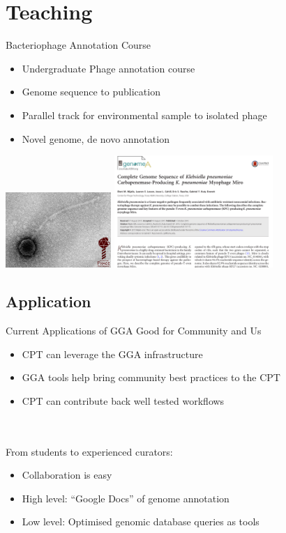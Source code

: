 \documentclass[12pt]{phage3slides} %
\begin{document}
\section{Teaching}
\begin{frame}{Bacteriophage Annotation Course}
    \begin{itemize}
        \item Undergraduate Phage annotation course
        \item Genome sequence to publication
        \item Parallel track for environmental sample to isolated phage
        \item Novel genome, de novo annotation
    \end{itemize}
    \includegraphics[width=4cm]{phage.png}
    \includegraphics[width=6cm]{pub.png}
\end{frame}

\subsection{Application}
\begin{frame}{Current Applications of GGA}
    Good for Community and Us
    \begin{itemize}
        \item CPT can leverage the GGA infrastructure
        \item GGA tools help bring community best practices to the CPT
        \item CPT can contribute back well tested workflows
    \end{itemize}
    \ \\\ \\
    From students to experienced curators:
    \begin{itemize}
        \item Collaboration is easy
        \item High level: ``Google Docs'' of genome annotation
        \item Low level: Optimised genomic database queries as tools
    \end{itemize}
\end{frame}
\end{document}
